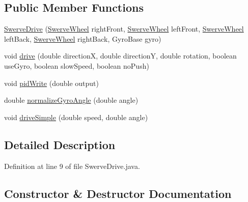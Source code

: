 \subsection*{Public Member Functions}
\begin{DoxyCompactItemize}
\item 
\mbox{\hyperlink{classorg_1_1usfirst_1_1frc3707_1_1_creedence_1_1swerve_1_1_swerve_drive_af25ca55f3b1ffbc9350b9729d770f7b7}{Swerve\+Drive}} (\mbox{\hyperlink{classorg_1_1usfirst_1_1frc3707_1_1_creedence_1_1swerve_1_1_swerve_wheel}{Swerve\+Wheel}} right\+Front, \mbox{\hyperlink{classorg_1_1usfirst_1_1frc3707_1_1_creedence_1_1swerve_1_1_swerve_wheel}{Swerve\+Wheel}} left\+Front, \mbox{\hyperlink{classorg_1_1usfirst_1_1frc3707_1_1_creedence_1_1swerve_1_1_swerve_wheel}{Swerve\+Wheel}} left\+Back, \mbox{\hyperlink{classorg_1_1usfirst_1_1frc3707_1_1_creedence_1_1swerve_1_1_swerve_wheel}{Swerve\+Wheel}} right\+Back, Gyro\+Base gyro)
\item 
void \mbox{\hyperlink{classorg_1_1usfirst_1_1frc3707_1_1_creedence_1_1swerve_1_1_swerve_drive_a7cc64894af097683d35c98c26dd7b002}{drive}} (double directionX, double directionY, double rotation, boolean use\+Gyro, boolean slow\+Speed, boolean no\+Push)
\item 
void \mbox{\hyperlink{classorg_1_1usfirst_1_1frc3707_1_1_creedence_1_1swerve_1_1_swerve_drive_a887fecd8715cfa4d5576a3ea829bf6cb}{pid\+Write}} (double output)
\item 
double \mbox{\hyperlink{classorg_1_1usfirst_1_1frc3707_1_1_creedence_1_1swerve_1_1_swerve_drive_a4a78f8451f4d7b85e3b88395a92a7218}{normalize\+Gyro\+Angle}} (double angle)
\item 
void \mbox{\hyperlink{classorg_1_1usfirst_1_1frc3707_1_1_creedence_1_1swerve_1_1_swerve_drive_aa3f4d7f38e0a6a511d5ea4fa1871dbe4}{drive\+Simple}} (double speed, double angle)
\end{DoxyCompactItemize}


\subsection{Detailed Description}


Definition at line 9 of file Swerve\+Drive.\+java.



\subsection{Constructor \& Destructor Documentation}
\mbox{\label{classorg_1_1usfirst_1_1frc3707_1_1_creedence_1_1swerve_1_1_swerve_drive_af25ca55f3b1ffbc9350b9729d770f7b7}} 

